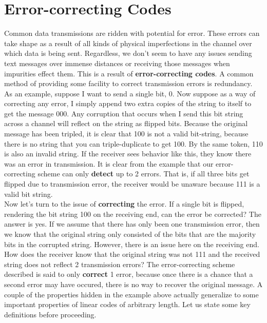 \documentclass[times,15pt]{article}
\theoremstyle{definition}
\begin{document}
\section{Error-correcting Codes}
\hspace*{8pt} Common data transmissions are ridden with potential for error.  These errors can take shape as a result of all kinds of physical imperfections in the channel over which data is being sent.  Regardless, we don't seem to have any issues sending text messages over immense distances or receiving those messages when impurities effect them.  This is a result of \textbf{error-correcting codes}.  A common method of providing some facility to correct transmission errors is redundancy.  As an example, suppose I want to send a single bit, 0.  Now suppose as a way of correcting any error, I simply append two extra copies of the string to itself to get the message 000.  Any corruption that occurs when I send this bit string across a channel will reflect on the string as flipped bits.  Because the original message has been tripled, it is clear that 100 is not a valid bit-string, because there is no string that you can triple-duplicate to get 100.  By the same token, 110 is also an invalid string.  If the receiver sees behavior like this, they know there was an error in transmission.  It is clear from the example that our error-correcting scheme can only \textbf{detect} up to 2 errors.  That is, if all three bits get flipped due to transmission error, the receiver would be unaware because 111 is a valid bit string.  \\
\hspace*{8pt} Now let's turn to the issue of \textbf{correcting} the error.  If a single bit is flipped, rendering the bit string 100 on the receiving end, can the error be corrected?  The answer is yes.  If we assume that there has only been one transmission error, then we know that the original string only consisted of the bits that are the majority bits in the corrupted string.  However, there is an issue here on the receiving end.  How does the receiver know that the original string was not 111 and the received string does not reflect 2 transmission errors?  The error-correcting scheme described is said to only \textbf{correct} 1 error, because once there is a chance that a second error may have occured, there is no way to recover the original message. 
\hspace*{8pt} A couple of the properties hidden in the example above actually generalize to some important properties of linear codes of arbitrary length.  Let us state some key definitions before proceeding.        
\end{document}
